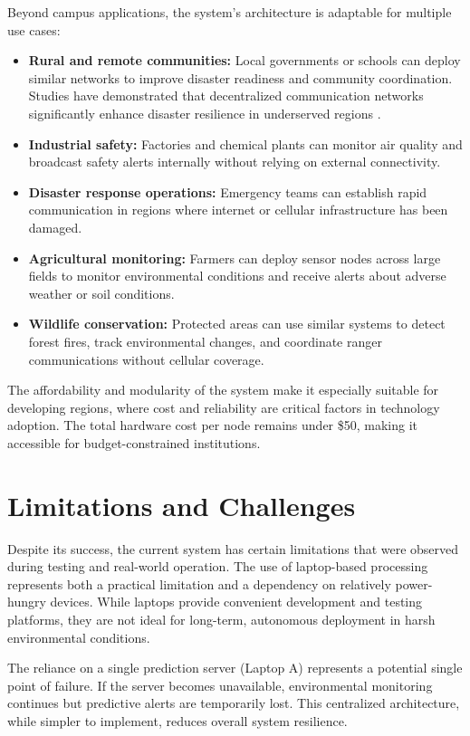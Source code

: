Beyond campus applications, the system's architecture is adaptable for multiple use cases:
\begin{itemize}
    \item \textbf{Rural and remote communities:} Local governments or schools can deploy similar networks to improve disaster readiness and community coordination. Studies have demonstrated that decentralized communication networks significantly enhance disaster resilience in underserved regions \cite{mehmood2017disaster}.
    \item \textbf{Industrial safety:} Factories and chemical plants can monitor air quality and broadcast safety alerts internally without relying on external connectivity.
    \item \textbf{Disaster response operations:} Emergency teams can establish rapid communication in regions where internet or cellular infrastructure has been damaged.
    \item \textbf{Agricultural monitoring:} Farmers can deploy sensor nodes across large fields to monitor environmental conditions and receive alerts about adverse weather or soil conditions.
    \item \textbf{Wildlife conservation:} Protected areas can use similar systems to detect forest fires, track environmental changes, and coordinate ranger communications without cellular coverage.
\end{itemize}

The affordability and modularity of the system make it especially suitable for developing regions, where cost and reliability are critical factors in technology adoption. The total hardware cost per node remains under \$50, making it accessible for budget-constrained institutions.

\section{Limitations and Challenges}
Despite its success, the current system has certain limitations that were observed during testing and real-world operation. The use of laptop-based processing represents both a practical limitation and a dependency on relatively power-hungry devices. While laptops provide convenient development and testing platforms, they are not ideal for long-term, autonomous deployment in harsh environmental conditions.

The reliance on a single prediction server (Laptop A) represents a potential single point of failure. If the server becomes unavailable, environmental monitoring continues but predictive alerts are temporarily lost. This centralized architecture, while simpler to implement, reduces overall system resilience.

